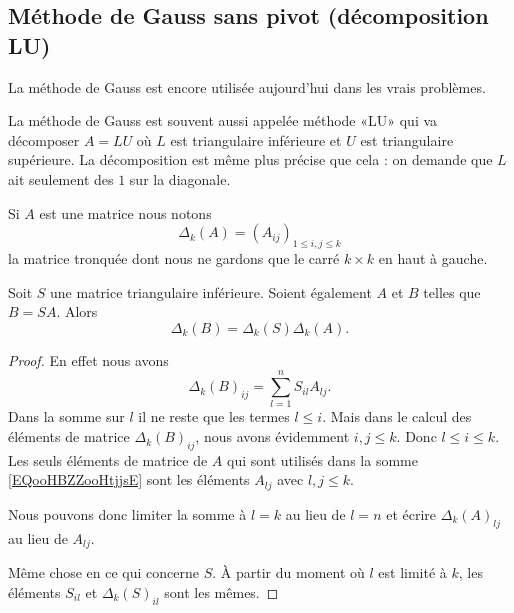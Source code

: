 \subsection{Méthode de Gauss sans pivot (décomposition LU)}

La méthode de Gauss est encore utilisée aujourd'hui dans les vrais problèmes.

La méthode de Gauss est souvent aussi appelée méthode «LU» qui va décomposer \( A=LU\) où \( L\) est triangulaire inférieure et \( U\) est triangulaire supérieure. La décomposition est même plus précise que cela : on demande que \( L\) ait seulement des \( 1\) sur la diagonale.

Si \( A\) est une matrice nous notons 
\begin{equation}
    \Delta_k(A)= (A_{ij})_{1\leq i,j\leq k}
\end{equation}
la matrice tronquée dont nous ne gardons que le carré \( k\times k\) en haut à gauche.

\begin{lemma}       \label{LEMooXEJFooGiYoyb}
    Soit \( S\) une matrice triangulaire inférieure. Soient également \( A\) et \( B\) telles que \( B=SA\). Alors
    \begin{equation}
        \Delta_k(B)=\Delta_k(S)\Delta_k(A).
    \end{equation}
\end{lemma}

\begin{proof}
     En effet nous avons
     \begin{equation}       \label{EQooHBZZooHtjjsE}
         \Delta_k(B)_{ij}=\sum_{l=1}^nS_{il}A_{lj}.
     \end{equation}
     Dans la somme sur \( l\) il ne reste que les termes \( l\leq i\). Mais dans le calcul des éléments de matrice \( \Delta_k(B)_{ij}\), nous avons évidemment \( i,j\leq k\). Donc \( l\leq i\leq k\). Les seuls éléments de matrice de \( A\) qui sont utilisés dans la somme \eqref{EQooHBZZooHtjjsE} sont les éléments \( A_{lj}\) avec \( l,j\leq k\). 
     
     Nous pouvons donc limiter la somme à \( l=k\) au lieu de \( l=n\) et écrire \( \Delta_k(A)_{lj}\) au lieu de \( A_{lj}\).

     Même chose en ce qui concerne \( S\). À partir du moment où \( l\) est limité à \( k\), les éléments \( S_{il}\) et \( \Delta_k(S)_{il}\) sont les mêmes.
\end{proof}

